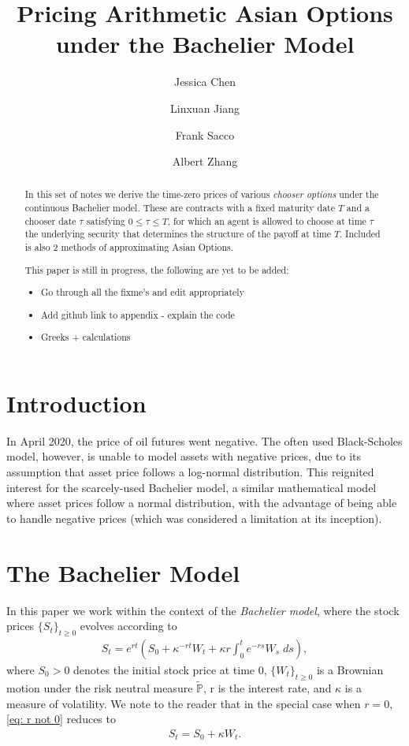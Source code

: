 \documentclass[reqno]{amsart}
\title{Pricing Arithmetic Asian Options under the Bachelier Model} %
\author{Jessica Chen}
\author{Linxuan Jiang}
\author{Frank Sacco}
\author{Albert Zhang}
\begin{document}
\begin{abstract}
     In this set of notes we derive the time-zero prices of various \emph{chooser options} under the continuous Bachelier model.
     These are contracts with a fixed maturity date $T$ and a chooser date $\tau$ satisfying $0 \le \tau \le T$, for which an agent is allowed to choose at time $\tau$ the underlying security that determines the structure of the payoff at time $T$.  
     Included is also 2 methods of approximating Asian Options.

     This paper is still in progress, the following are yet to be added:
     \begin{itemize}
          \item Go through all the fixme's and edit appropriately
          \item Add github link to appendix - explain the code
          \item Greeks + calculations
     \end{itemize}
\end{abstract}


\maketitle  
\tableofcontents

\pagebreak
\section{Introduction}
In April 2020, the price of oil futures went negative.
The often used Black-Scholes model, however, is unable to model assets with negative prices, due to its assumption that asset price follows a log-normal distribution.
This reignited interest for the scarcely-used Bachelier model, a similar mathematical model where asset prices follow a normal distribution, with the advantage of being able to handle negative prices (which was considered a limitation at its inception).

\section{The Bachelier Model}
In this paper we work within the context of the \emph{Bachelier model}, where the stock prices $\{S_t\}_{t \ge 0}$ evolves according to 
\begin{align}\label{eq: r not 0}
	 S_t = e^{rt} \left( S_0 + \kappa^{-rt}W_t + \kappa r \int_0^t e^{-rs} W_s \; ds \right),
\end{align}
where $S_0 > 0$ denotes the initial stock price at time 0, $\{W_t\}_{t \ge 0}$ is a Brownian motion under the risk neutral measure $\tilde{\mathbb{P}}$, r is the interest rate, and $\kappa$ is a measure of volatility.
We note to the reader that in the special case when $r = 0$, \eqref{eq: r not 0} reduces to 
\begin{align}\label{eq: r=0}
     S_t = S_0 + \kappa W_t. 
\end{align}
\end{document}
